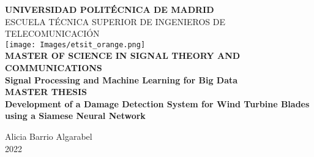 \begin{titlepage}
	\newlength{\centeroffset}
	\setlength{\centeroffset}{-0.5\oddsidemargin}
	\addtolength{\centeroffset}{0.5\evensidemargin}
	\thispagestyle{empty}
	\noindent\hspace*{\centeroffset}
	\begin{minipage}{\textwidth}

		\pagecolor{portada}
		\centering
		\LARGE{\textbf{UNIVERSIDAD POLITÉCNICA DE MADRID}}\\[0.7cm]
		\Large{ESCUELA TÉCNICA SUPERIOR DE INGENIEROS DE TELECOMUNICACIÓN}\\[0.7cm]
		\texttt{[image: Images/etsit\_orange.png]}\\[1cm]
		\LARGE{\textbf{MASTER OF SCIENCE IN SIGNAL THEORY AND COMMUNICATIONS\\}}
		\Large{\textbf{Signal Processing and Machine Learning for Big Data}}\\[0.5cm]
		\LARGE{\textbf{MASTER THESIS}\\[3cm]}
		\LARGE{\textbf{Development of a Damage Detection
System for Wind Turbine Blades using a
Siamese Neural Network}}\\

	\end{minipage}

	\vspace{2.6cm}
	\noindent\hspace*{\centeroffset}\begin{minipage}{\textwidth}
		\centering

		\Large{Alicia Barrio Algarabel}\\[2ex]
		\large{2022}
	
	\end{minipage}
\end{titlepage}

\pagecolor{white}


